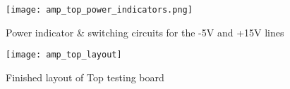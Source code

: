 \begin{figure}[!htb]
	\centering
	\texttt{[image: amp\_top\_power\_indicators.png]}
	\caption{Power indicator \& switching circuits for the -5V and +15V lines}
\end{figure}
\begin{figure}[!htb]
	\centering
	\texttt{[image: amp\_top\_layout]}
	\caption{Finished layout of Top testing board}
\end{figure}
